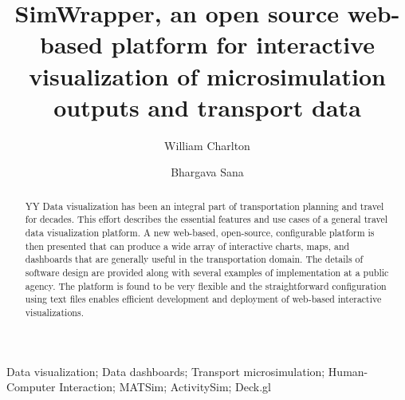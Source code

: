 \documentclass[3p,times,procedia]{elsarticle}
\begin{document}
\begin{frontmatter}



%

\title{SimWrapper, an open source web-based platform for interactive visualization of microsimulation outputs and transport data}

\author[a]{William Charlton}
\author[b]{Bhargava Sana}

\address[a]{Technische Universität Berlin, Chair of Transport Systems Planning and Transport Telematics, Straße des 17. Juni 135, 10623 Berlin, Germany}
\address[b]{San Diego Association of Governments, 401 B Street, Unit 800, San Diego, CA 92101, United States}

\begin{abstract}
YY
Data visualization has been an integral part of transportation planning and travel for decades. This effort describes the essential features and use cases of a general travel data visualization platform. A new web-based, open-source, configurable platform is then presented that can produce a wide array of interactive charts, maps, and dashboards that are generally useful in the transportation domain. The details of software design are provided along with several examples of implementation at a public agency. The platform is found to be very flexible and the straightforward configuration using text files enables efficient development and deployment of web-based interactive visualizations.

\end{abstract}

\begin{keyword}
Data visualization; Data dashboards; Transport microsimulation; Human-Computer Interaction; MATSim; ActivitySim; Deck.gl
\end{keyword}
\end{frontmatter}
\end{document}
